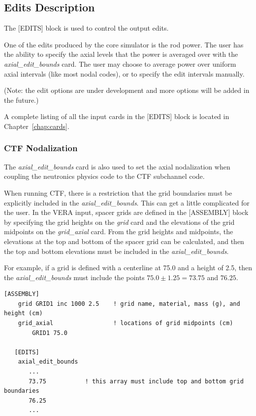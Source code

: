 \subsection{Edits Description}

The [EDITS] block is used to control the output edits.

One of the edits produced by the core simulator is the rod power.   The user has
the ability to specify the axial levels that the power is averaged over with
the {\it axial\_edit\_bounds} card.
The user may choose to average power over uniform axial intervals (like most nodal codes),
or to specify the edit intervals manually.

(Note: the edit options are under development and more options will be added in the future.)

A complete listing of all the input cards in the [EDITS] block is located in Chapter~\ref{chap:cards}.

\subsubsection{CTF Nodalization}

The {\it axial\_edit\_bounds} card is also used to set the axial nodalization when coupling
the neutronics physics code to the CTF subchannel code.

When running CTF, there is a restriction that the grid boundaries must be explicitly
included in the {\it axial\_edit\_bounds}. This can get a little complicated for the user.
In the VERA input, spacer grids are defined in the [ASSEMBLY] block by specifying the
grid heights on the {\it grid} card and the elevations of the grid midpoints
on the {\it grid\_axial} card.
From the grid heights and midpoints, the elevations at the top and bottom of the spacer grid
can be calculated, and then the top and bottom elevations must be included
in the {\it axial\_edit\_bounds}.

For example, if a grid is defined with a centerline at 75.0 and a height of 2.5, then the
{\it axial\_edit\_bounds} must include the points $75.0 \pm 1.25 = 73.75$ and $76.25$.

\begin{Verbatim}[fontsize=\small]
   [ASSEMBLY]
    grid GRID1 inc 1000 2.5    ! grid name, material, mass (g), and height (cm)
    grid_axial                 ! locations of grid midpoints (cm)
        GRID1 75.0

   [EDITS]
    axial_edit_bounds
       ...
       73.75           ! this array must include top and bottom grid boundaries
       76.25
       ...
\end{Verbatim}

